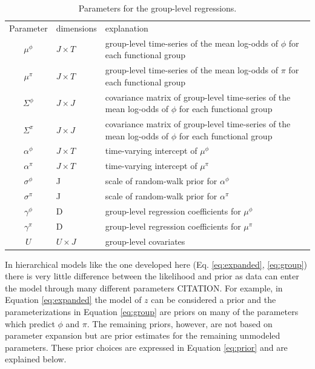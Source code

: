 \documentclass[12pt,letterpaper]{article}
\begin{document}
\begin{table}
  \centering
  \caption{Parameters for the group-level regressions.}
  \begin{tabular}{c l l}
    Parameter & dimensions & explanation \\
    \(\mu^{\phi}\) & \(J \times T\) & group-level time-series of the mean log-odds of \(\phi\) for each functional group \\
    \(\mu^{\pi}\) & \(J \times T\) & group-level time-series of the mean log-odds of \(\pi\) for each functional group \\ 
    \(\Sigma^{\phi}\) & \(J \times J\) & covariance matrix of group-level time-series of the mean log-odds of \(\phi\) for each functional group \\
    \(\Sigma^{\pi}\) & \(J \times J\) & covariance matrix of group-level time-series of the mean log-odds of \(\phi\) for each functional group \\
    \(\alpha^{\phi}\) & \(J \times T\) & time-varying intercept of \(\mu^{\phi}\) \\
    \(\alpha^{\pi}\) & \(J \times T\) & time-varying intercept of \(\mu^{\pi}\) \\
    \(\sigma^{\phi}\) & J & scale of random-walk prior for \(\alpha^{\phi}\) \\
    \(\sigma^{\pi}\) & J & scale of random-walk prior for \(\alpha^{\pi}\) \\
    \(\gamma^{\phi}\) & D & group-level regression coefficients for \(\mu^{\phi}\) \\
    \(\gamma^{\pi}\) & D & group-level regression coefficients for \(\mu^{\pi}\) \\
    \(U\) & \(U \times J\) & group-level covariates \\
    \hline
  \end{tabular}
  \label{tab:group}
\end{table}

In hierarchical models like the one developed here (Eq. \ref{eq:expanded}, \ref{eq:group}) there is very little difference between the likelihood and prior as data can enter the model through many different parameters CITATION. For example, in Equation \ref{eq:expanded} the model of \(z\) can be considered a prior and the parameterizations in Equation \ref{eq:group} are priors on many of the parameters which predict \(\phi\) and \(\pi\). The remaining priors, however, are not based on parameter expansion but are prior estimates for the remaining unmodeled parameters. These prior choices are expressed in Equation \ref{eq:prior} and are explained below.
\end{document}
